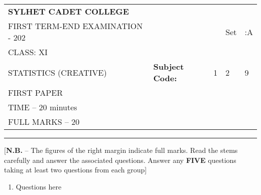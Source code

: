 \documentclass{article}
\begin{document}
\begin{table}[h]
\centering
\begin{tabular}{lllll}
\textbf{\large SYLHET CADET COLLEGE} &  &  &  &  \\ \cline{4-5} 
FIRST TERM-END EXAMINATION - 202 &  & \multicolumn{1}{l|}{} & \multicolumn{1}{l|}{Set} & \multicolumn{1}{l|}{:A} \\ \cline{4-5} 
CLASS: XI &  &  &  &  \\ \cline{3-5} 
STATISTICS (CREATIVE)& \multicolumn{1}{l|}{\textbf{Subject Code:}} & \multicolumn{1}{l|}{1} & \multicolumn{1}{l|}{2} & \multicolumn{1}{l|}{9} \\ \cline{3-5} 
 FIRST PAPER &  &  &  &  \\
TIME – 20 minutes &  &  &  &  \\
FULL MARKS – 20 &  &  &  & 
\end{tabular}
\end{table}

\hrule

\begin{center}
[\textbf{N.B.} – The figures of the right margin indicate full marks. Read the stems carefully and answer the associated questions. Answer any \textbf{FIVE} questions taking at least two questions from each group]\\


\end{center}
  \begin{enumerate}
  
  \item Questions here %

  
\end{enumerate}
\end{document}
